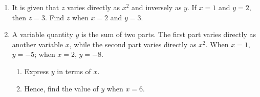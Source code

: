 \documentclass[11pt]{article}
\begin{document}
\begin{enumerate}
            \hrulefill
            
            \hrulefill

        \item It is given that $z$ varies directly as $x^2$ and inversely as $y$. If $x=1$ and $y=2$, then $z=3$. Find $z$ when $x=2$ and $y=3$.
        
        \hrulefill

            \hrulefill
            
            \hrulefill
            
            \hrulefill
            
            \hrulefill
            
            \hrulefill
            
            \hrulefill
            
            \hrulefill
            
            \hrulefill
            
            \hrulefill
            
            \hrulefill
            
            \hrulefill

        \pagebreak
        \item A variable quantity $y$ is the sum of two parts. The first part varies directly as another variable $x$, while the second part varies directly as $x^2$. When $x=1$, $y=-5$; when $x=2$, $y=-8$.\begin{enumerate}
            \item Express $y$ in terms of $x$.
            \item Hence, find the value of $y$ when $x=6$.
        \end{enumerate}

        \hrulefill

            \hrulefill
            
            \hrulefill
            
            \hrulefill
            
            \hrulefill
            
            \hrulefill
            
            \hrulefill
            
            \hrulefill
            
            \hrulefill
            
            \hrulefill
            

\end{enumerate}
\end{document}
